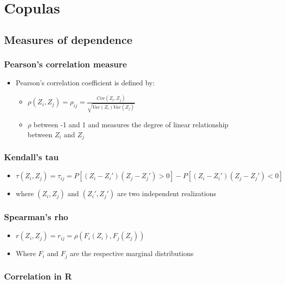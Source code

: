 \documentclass{article}
\begin{document}
\section{Copulas}


\subsection{Measures of dependence}
\subsubsection{Pearson's correlation measure}

\begin{itemize}
    \item Pearson's correlation coefficient is defined by:
    \begin{itemize}
        \item $\rho(Z_i, Z_j) = \rho_{ij} = \frac{Cov(Z_i,Z_j)}{\sqrt{Var(Z_i) Var(Z_j)}}$
        \item $\rho$ between -1 and 1 and measures the degree of linear relationship between $Z_i$ and $Z_j$
    \end{itemize}
\end{itemize}

\subsubsection{Kendall's tau}
\begin{itemize}
    \item $\tau(Z_i, Z_j) = \tau_{ij} = P[(Z_i - Z_i')(Z_j - Z_j')>0] - P[(Z_i - Z_i')(Z_j - Z_j')<0]$
    \item where $(Z_i, Z_j)$ and $(Z_i', Z_j')$ are two independent realizations
\end{itemize}


\subsubsection{Spearman's rho}
\begin{itemize}
    \item $r(Z_i,Z_j) = r_{ij} = \rho(F_i(Z_i), F_j(Z_j))$
    \item Where $F_i$ and $F_j$ are the respective marginal distributions
\end{itemize}


\subsubsection{Correlation in R}
\end{document}
